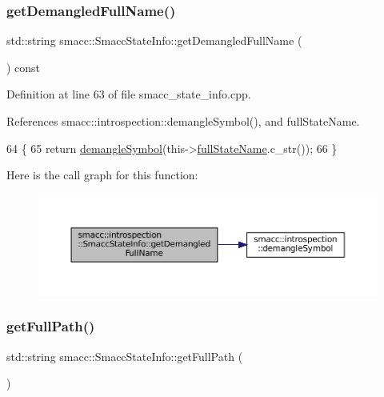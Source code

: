 \subsubsection{\texorpdfstring{get\+Demangled\+Full\+Name()}{getDemangledFullName()}}
{\footnotesize\ttfamily std\+::string smacc\+::\+Smacc\+State\+Info\+::get\+Demangled\+Full\+Name (\begin{DoxyParamCaption}{ }\end{DoxyParamCaption}) const}



Definition at line 63 of file smacc\+\_\+state\+\_\+info.\+cpp.



References smacc\+::introspection\+::demangle\+Symbol(), and full\+State\+Name.


\begin{DoxyCode}
64 \{
65     \textcolor{keywordflow}{return} \hyperlink{namespacesmacc_1_1introspection_a2f495108db3e57604d8d3ff5ef030302}{demangleSymbol}(this->\hyperlink{classsmacc_1_1introspection_1_1SmaccStateInfo_aef6053863f757bf9af16fe4da75c51de}{fullStateName}.c\_str());
66 \}
\end{DoxyCode}
Here is the call graph for this function\+:
\nopagebreak
\begin{figure}[H]
\begin{center}
\leavevmode
\includegraphics[width=350pt]{classsmacc_1_1introspection_1_1SmaccStateInfo_a76899507f734e549df07363ba910e94d_cgraph}
\end{center}
\end{figure}
\mbox{\label{classsmacc_1_1introspection_1_1SmaccStateInfo_a22e625806a74808ee272df5c034d122e}} 
\subsubsection{\texorpdfstring{get\+Full\+Path()}{getFullPath()}}
{\footnotesize\ttfamily std\+::string smacc\+::\+Smacc\+State\+Info\+::get\+Full\+Path (\begin{DoxyParamCaption}{ }\end{DoxyParamCaption})}



